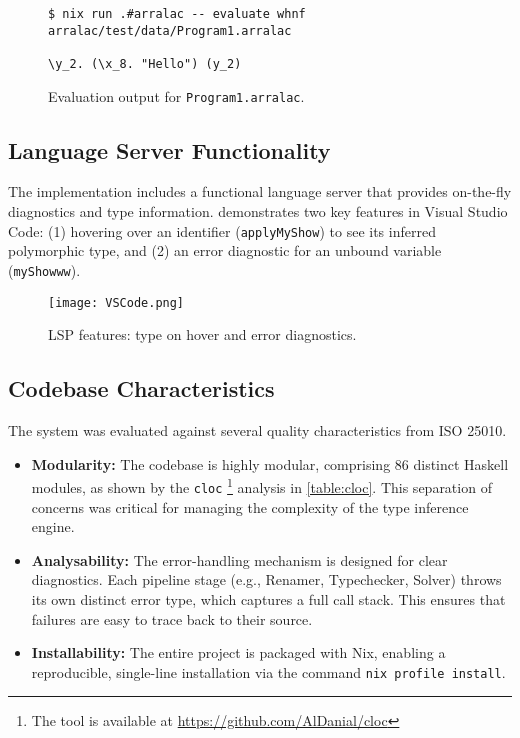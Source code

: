 \begin{figure}
  \centering
  \begin{verbatim}
$ nix run .#arralac -- evaluate whnf arralac/test/data/Program1.arralac

\y_2. (\x_8. "Hello") (y_2)
\end{verbatim}
  \caption{Evaluation output for \texttt{Program1.arralac}.}
  \label{fig:evaluate-output}
\end{figure}

\subsection{Language Server Functionality}
The implementation includes a functional language server that provides on-the-fly diagnostics and type information.  demonstrates two key features in Visual Studio Code: (1) hovering over an identifier (\texttt{applyMyShow}) to see its inferred polymorphic type, and (2) an error diagnostic for an unbound variable (\texttt{myShowww}).

\begin{figure}[h!]
  \centering
  \texttt{[image: VSCode.png]}
  \caption{LSP features: type on hover and error diagnostics.}
  \label{fig:lsp-demo}
\end{figure}

\subsection{Codebase Characteristics}
The system was evaluated against several quality characteristics from ISO 25010.
\begin{itemize}
  \item \textbf{Modularity:} The codebase is highly modular, comprising 86 distinct Haskell modules, as shown by the \texttt{cloc} \footnote{The tool is available at \url{https://github.com/AlDanial/cloc}} analysis in \cref{table:cloc}. This separation of concerns was critical for managing the complexity of the type inference engine.
  \item \textbf{Analysability:} The error-handling mechanism is designed for clear diagnostics. Each pipeline stage (e.g., Renamer, Typechecker, Solver) throws its own distinct error type, which captures a full call stack. This ensures that failures are easy to trace back to their source.
  \item \textbf{Installability:} The entire project is packaged with Nix, enabling a reproducible, single-line installation via the command \texttt{nix profile install}.
\end{itemize}


